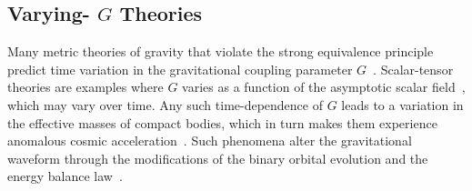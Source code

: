 \documentclass[prd,twocolumn,nofootinbib]{revtex4-1}
\begin{document}
\subsection{Varying- $G$ Theories}\label{vaying-G}
Many metric theories of gravity that violate the strong equivalence principle~\cite{DiCasola:2013iia,Will:2014kxa,0264-9381-7-10-007} predict time variation in the gravitational coupling parameter $G$~\cite{uzan:2010pm}. Scalar-tensor theories are examples where $G$ varies as a function of the asymptotic scalar field~\cite{Will2006}, which may vary over time. Any such time-dependence of $G$ leads to a variation in the effective masses of compact bodies, which in turn makes them experience anomalous cosmic acceleration~\cite{PhysRevLett.65.953}. Such phenomena alter the gravitational waveform through the modifications of the binary orbital evolution and the energy balance law~\cite{Tahura:2018zuq}.
\end{document}
